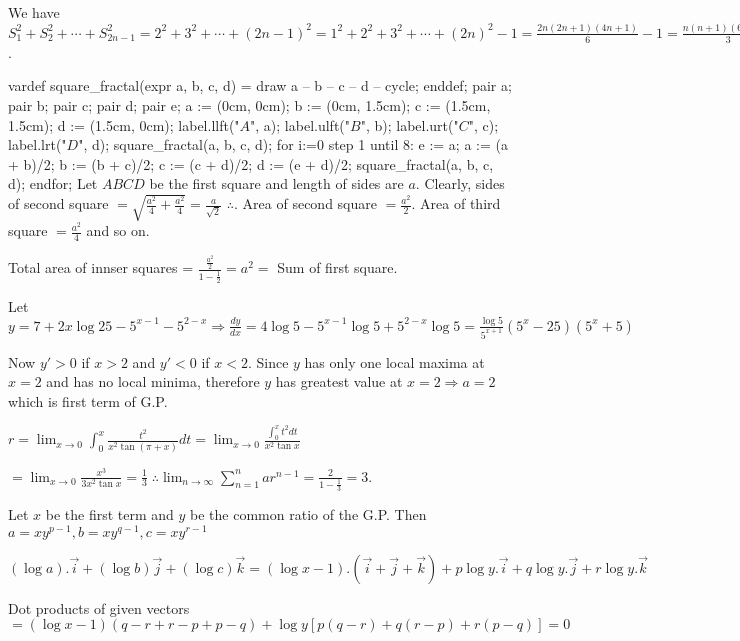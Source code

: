   We have $S_1^2 + S_2^2 + \cdots + S_{2n - 1}^2 = 2^2 + 3^2 + \cdots + (2n - 1)^2 = 1^2 + 2^2 + 3^2 + \cdots +
  (2n)^2 - 1 = \frac{2n(2n + 1)(4n + 1)}{6} - 1 = \frac{n(n + 1)(6n + 1)}{3} - 1$.
\item   \startplacefigure[location={left, none}]
  \startMPinclusions
    vardef square_fractal(expr a, b, c, d) =
      draw a -- b -- c -- d -- cycle;
    enddef;
  \stopMPinclusions
  \startMPcode
    pair a; pair b; pair c; pair d; pair e;
    a := (0cm, 0cm); b := (0cm, 1.5cm); c := (1.5cm, 1.5cm); d := (1.5cm, 0cm);
    label.llft("$A$", a);
    label.ulft("$B$", b);
    label.urt("$C$", c);
    label.lrt("$D$", d);
    square_fractal(a, b, c, d);
    for i:=0 step 1 until 8:
      e := a;
      a := (a + b)/2; b := (b + c)/2; c := (c + d)/2; d := (e + d)/2;
      square_fractal(a, b, c, d);
    endfor;
  \stopMPcode
\stopplacefigure
Let $ABCD$ be the first square and length of sides are $a$. Clearly, sides of second square $=
\sqrt{\frac{a^2}{4} + \frac{a^2}{4}} = \frac{a}{\sqrt{2}}$ $\therefore$. Area of second square $=
\frac{a^2}{2}$. Area of third square $= \frac{a^2}{4}$ and so on.

Total area of innser squares = $\frac{\tfrac{a^2}{2}}{1 - \frac{1}{2}} = a^2 =$ Sum of first square.
\item Let $y = 7 + 2x\log 25 - 5^{x - 1} - 5^{2 - x} \Rightarrow \frac{dy}{dx} = 4\log 5 - 5^{x - 1}\log 5 +
  5^{2 - x}\log 5 = \frac{\log 5}{5^{x + 1}}(5^x - 25)(5^x + 5)$

  Now $y' > 0$ if $x > 2$ and $y' < 0$ if $x < 2$. Since $y$ has only one local maxima at $x = 2$ and has no
  local minima, therefore $y$ has greatest value at $x = 2 \Rightarrow a = 2$ which is first term of G.P.

  $r = \displaystyle\lim_{x\to 0}\int_{0}^x\frac{t^2}{x^2\tan(\pi + x)}dt = \lim_{x\to
    0}\frac{\int_0^xt^2dt}{x^2\tan x}$

  $= \lim_{x\to 0}\frac{x^3}{3x^2\tan x} = \frac{1}{3}\;\therefore \displaystyle\lim_{n \to \infty}\sum_{n
    =1}^nar^{n - 1} = \frac{2}{1 - \tfrac{1}{3}} = 3$.
\item Let $x$ be the first term and $y$ be the common ratio of the G.P. Then $a = xy^{p-1}, b = xy^{q-1}, c
  = xy^{r-1}$

  $(\log a).\vec{i} + (\log b)\vec{j} + (\log c)\vec{k} = (\log x - 1).(\vec{i} + \vec{j} + \vec{k}) + p\log
  y.\vec{i} + q\log y.\vec{j} + r\log y.\vec{k}$

  Dot products of given vectors $= (\log x - 1)(q - r + r - p + p - q) + \log y[p(q - r) + q(r - p) + r(p -
    q)] = 0$

